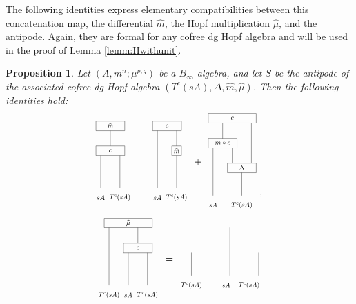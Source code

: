 \documentclass[a4paper, 11pt]{amsart}
\newcommand{\tikzmath}[2][]
{\vcenter{\hbox{\scalebox{0.7}{\begin{tikzpicture}[#1]#2\end{tikzpicture}}}}
}
\newtheorem{prop}[thm]{Proposition}
\theoremstyle{definition}
\theoremstyle{remark}
\numberwithin{equation}{section}
\begin{document}
The following identities express elementary compatibilities between this concatenation map, the differential $\widehat m$, the Hopf multiplication $\widehat\mu$, and the antipode. Again, they are formal for any cofree dg Hopf algebra and will be used in the proof of Lemma \ref{lemm:Hwithunit}.
\begin{prop}\label{prop:concatenationidentity}
Let $(A,m^n;\mu^{p,q})$ be a $B_\infty$-algebra, and let $S$ be the antipode of the associated cofree dg Hopf algebra $(T^c(sA),\Delta,\widehat m,\widehat\mu)$. Then the following identities hold:
\begin{equation}\label{equ:mwithc}
\tikzmath{
\draw (0, -.5) --(0, 1.2);
\draw (1, -.5) --(1, 1.2);
\node at (., -1) {$sA$};
\node at (1, -1) {$T^c(sA)$};
\draw (1.25, 1.2) rectangle (-.25, 1.7);
\node at (.5, 1.45) {$c$};
\draw (.5, 1.7) -- (.5, 2.5);
\draw (1.25, 2.5) rectangle (-.25, 3);
\node at (.5, 2.75) {$\widehat{m}$};
}\hspace{1 mm} = \hspace{1 mm} \tikzmath{
\draw (0, -.5) --(0, 2.5);
\draw (1, -.5) --(1, 1.2);
\node at (., -1) {$sA$};
\node at (1, -1) {$T^c(sA)$};
\draw (1.25, 1.2) rectangle (.75, 1.7);
\node at (1, 1.45) {$\widehat{m}$};
\draw (1, 1.7) -- (1, 2.5);
\draw (1.25, 2.5) rectangle (-.25, 3);
\node at (.5, 2.75) {$c$};
}\hspace{1 mm} + \hspace{1 mm}
\tikzmath{
\draw (-2, 0) --(-2, 2.5);
\draw (-.5, 0) --(-.5, 1.2);
\node at (-2, -.5) {$sA$};
\node at (-.5, -.5) {$T^c(sA)$};
\draw (-1.25, 1.2) rectangle (.25, 1.7);
\node at (-.5, 1.45) {$\Delta$};
\draw (-1, 1.7) --(-1, 2.5);
\draw (0, 1.7) --(0, 3.8);
\draw (-2.25, 2.5) rectangle (-.75, 3);
\node at (-1.5, 2.75) {$m\circ c$};
\draw (-1.5, 3) -- (-1.5, 3.8);
\draw (-2.25, 3.8) rectangle (.25, 4.3);
\node at (-1, 4.05) {$c$};
\node at (.5, 0) {,};
}
\end{equation}
\begin{equation}\label{equ:muwithc}
\tikzmath{
\draw (-1, -.5) --(-1, 2.5);
\draw (0, -.5) --(0, 1.2);
\draw (1, -.5) --(1, 1.2);
\node at (-1, -1) {$T^c(sA)$};
\node at (., -1) {$sA$};
\node at (1, -1) {$T^c(sA)$};

\draw (1.25, 1.2) rectangle (-.25, 1.7);
\node at (.5, 1.45) {$c$};
\draw (.5, 1.7) -- (.5, 2.5);
\draw (-1.25, 2.5) rectangle (1.25, 3);
\node at (0, 2.75) {$\widehat{\mu}$};
}
\hspace{1 mm} = \hspace{1 mm}
\tikzmath{
\draw (-2, 0) --(-2, 1.2);
\draw (0, 0) --(0, 2.5);
\draw (1.5, 0) --(1.5, 1.2);
\node at (-2, -.5) {$T^c(sA)$};
\node at (-.2, -.5) {$sA$};
\node at (1, -.5) {$T^c(sA)$};

}
\end{equation}
\end{prop}
\end{document}
